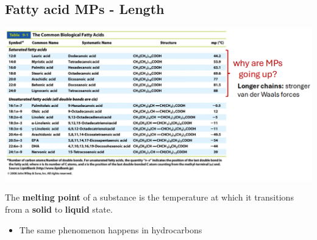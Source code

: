 \documentclass[10pt]{article}
\begin{document}
\subsection*{Fatty acid MPs - Length}
\begin{center}
    \includegraphics*[width=\textwidth]{L2_10.png}
\end{center}
The \textbf{melting point} of a substance is the temperature at which it transitions from a \textbf{solid} to \textbf{liquid} state.
\begin{itemize}
    \item The same phenomenon happens in hydrocarbons
\end{itemize}
\end{document}
